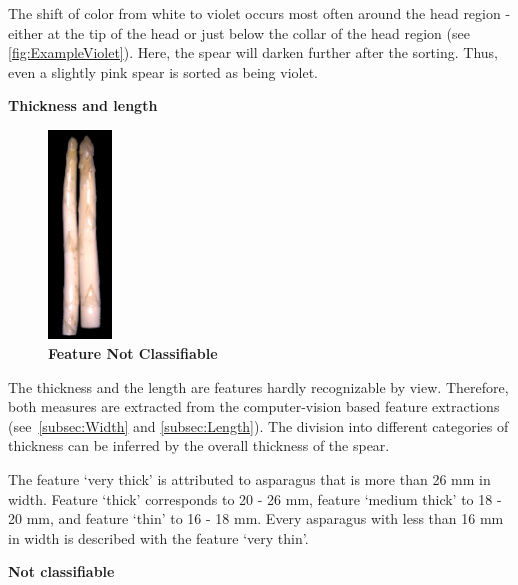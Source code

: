 The shift of color from white to violet occurs most often around the head region - either at the tip of the head or just below the collar of the head region (see \autoref{fig:ExampleViolet}).
Here, the spear will darken further after the sorting. Thus, even a slightly pink spear is sorted as being violet.

\vspace{8cm}
\textbf{Thickness and length}

\begin{figure}
  \centering
  \includegraphics[width=0.15\textwidth]{Figures/chapter03/example_img_thick.png}
  \caption[Example Image Not Classifiable]{ \textbf{Feature Not Classifiable}}
  \label{fig:ExampleThickness}
\end{figure}

The thickness and the length are features hardly recognizable by view. Therefore, both measures are extracted from the computer-vision based feature extractions (see~\autoref{subsec:Width} and \autoref{subsec:Length}). The division into different categories of thickness can be inferred by the overall thickness of the spear.

The feature ‘very thick’ is attributed to asparagus that is more than 26 mm in width. Feature ‘thick’ corresponds to 20 - 26 mm, feature ‘medium thick’ to 18 - 20 mm, and feature ‘thin’ to 16 - 18 mm. Every asparagus with less than 16 mm in width is described with the feature ‘very thin’.

\bigskip
\textbf{Not classifiable}


